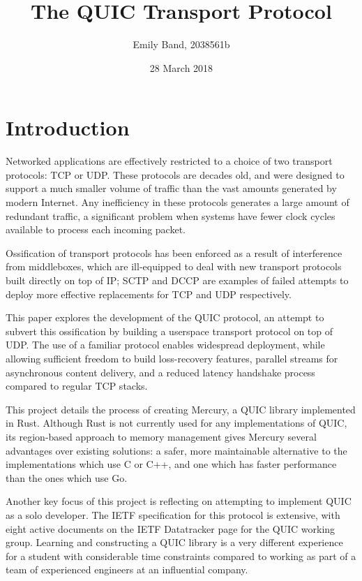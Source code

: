 \documentclass{l4proj}
\begin{document}
\graphicspath{ {/} }

\title{%
  The QUIC Transport Protocol}
\author{Emily Band, 2038561b}
\date{28 March 2018}
\maketitle

\educationalconsent

\tableofcontents

\pagebreak

\chapter{Introduction}


Networked applications are effectively restricted to a choice of two transport protocols: TCP or UDP. These protocols are decades old, and were designed to support a much smaller volume of traffic than the vast amounts generated by modern Internet. Any inefficiency in these protocols generates a large amount of redundant traffic, a significant problem when systems have fewer clock cycles available to process each incoming packet.

Ossification of transport protocols has been enforced as a result of interference from middleboxes, which are ill-equipped to deal with new transport protocols built directly on top of IP; SCTP and DCCP are examples of failed attempts to deploy more effective replacements for TCP and UDP respectively.

This paper explores the development of the QUIC protocol, an attempt to subvert this ossification by building a userspace transport protocol on top of UDP. The use of a familiar protocol enables widespread deployment, while allowing sufficient freedom to build loss-recovery features, parallel streams for asynchronous content delivery, and a reduced latency handshake process compared to regular TCP stacks.

This project details the process of creating Mercury, a QUIC library implemented in Rust. Although Rust is not currently used for any implementations of QUIC\cite{quic-implementations}, its region-based approach to memory management gives Mercury several advantages over existing solutions: a safer, more maintainable alternative to the implementations which use C or C++, and one which has faster performance than the ones which use Go.\cite{govsrust}

Another key focus of this project is reflecting on attempting to implement QUIC as a solo developer. The IETF specification for this protocol is extensive, with eight active documents on the IETF Datatracker page for the QUIC working group.\cite{quic-documents} Learning and constructing a QUIC library is a very different experience for a student with considerable time constraints compared to working as part of a team of experienced engineers at an influential company.
\end{document}
